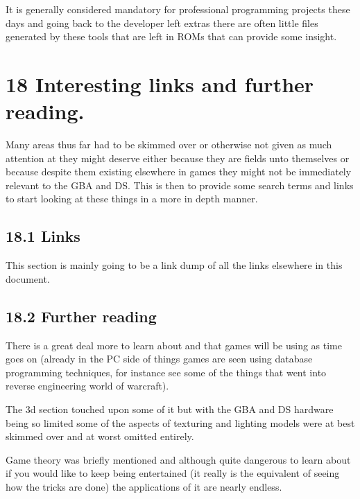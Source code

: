 \documentclass[
]{book}
\begin{document}
It is generally considered mandatory for professional programming projects these days and going back to the developer left extras there are often little files generated by these tools that are left in ROMs that can provide some insight.

\hypertarget{interesting-links-and-further-reading.}{%
\chapter{18 Interesting links and further reading.}\label{interesting-links-and-further-reading.}}

Many areas thus far had to be skimmed over or otherwise not given as much attention at they might deserve either because they are fields unto themselves or because despite them existing elsewhere in games they might not be immediately relevant to the GBA and DS. This is then to provide some search terms and links to start looking at these things in a more in depth manner.

\hypertarget{links}{%
\section{18.1 Links}\label{links}}

This section is mainly going to be a link dump of all the links elsewhere in this document.

\hypertarget{further-reading}{%
\section{18.2 Further reading}\label{further-reading}}

There is a great deal more to learn about and that games will be using as time goes on (already in the PC side of things games are seen using database programming techniques, for instance see some of the things that went into reverse engineering world of warcraft).

The 3d section touched upon some of it but with the GBA and DS hardware being so limited some of the aspects of texturing and lighting models were at best skimmed over and at worst omitted entirely.

Game theory was briefly mentioned and although quite dangerous to learn about if you would like to keep being entertained (it really is the equivalent of seeing how the tricks are done) the applications of it are nearly endless.
\end{document}

